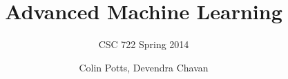 
{

}

\usepackage[english]{babel}
\usepackage[latin1]{inputenc}


\title[CSC 722 Spring 2014] %
{Advanced Machine Learning}

\subtitle{CSC 722 Spring 2014} %

\author{Colin Potts, Devendra Chavan} %


\def\insertcopyright{$\copyright$ 2014 by Dr. Bahler}
\def\insertslideinfo{\insertshorttitle}

\subject{Advanced Machine Learning}










